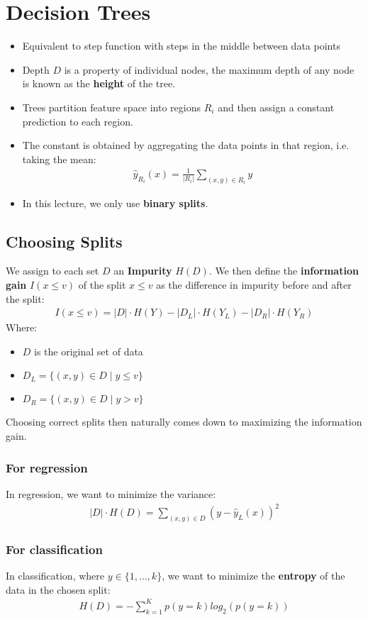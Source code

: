 \documentclass{report}
\newcommand{\tbf}{\textbf}
\newcommand{\yhat}{\hat{y}}
\begin{document}
\chapter{Decision Trees}
\begin{itemize}
 \item Equivalent to step function with steps in the middle between data points
 \item Depth $D$ is a property of individual nodes, the maximum depth of any node is known as the \tbf{height} of the tree.
 \item Trees partition feature space into regions $R_i$ and then assign a constant prediction to each region.
 \item The constant is obtained by aggregating the data points in that region, i.e. taking the mean:
 \begin{align}
  \yhat_{R_i}(x) = \frac{1}{|R_i|} \sum_{(x,y) \in R_i} y
 \end{align}

 \item In this lecture, we only use \tbf{binary splits}.
\end{itemize}
%
\section{Choosing Splits}
We assign to each set $D$ an \tbf{Impurity} $H(D)$.
We then define the \tbf{information gain} $I(x \leq v)$ of the split $x \leq v$ as the difference in impurity before and after the split:
\begin{align}
 I(x \leq v) = |D| \cdot H(Y) - |D_L| \cdot H(Y_L) - |D_R| \cdot H(Y_R)
\end{align}
Where:
\begin{itemize}
 \item $D$ is the original set of data
 \item $D_L = \{(x,y) \in D \mid y \leq v\}$
 \item $D_R = \{(x,y) \in D \mid y > v\}$
\end{itemize}
Choosing correct splits then naturally comes down to maximizing the information gain.
%
\subsection{For regression}
In regression, we want to minimize the variance:
\begin{align}
 |D| \cdot H(D) = \sum_{(x,y) \in D} (y - \yhat_L(x))^2
\end{align}
%
\subsection{For classification}
In classification, where $y \in \{1, \hdots, k\}$, we want to minimize the \tbf{entropy} of the data in the chosen split:
\begin{align}
 H(D) = -\sum_{k=1}^K p(y = k) log_2(p(y=k))
\end{align}
%
\end{document}
